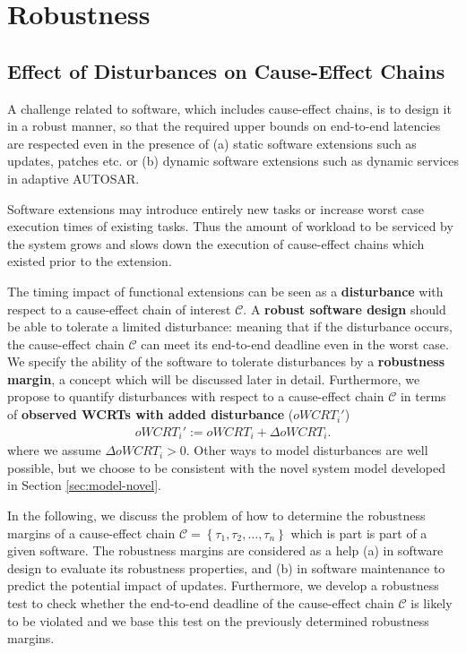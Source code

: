 \section{Robustness}
\label{sec:robustness}

\subsection{Effect of Disturbances on Cause-Effect Chains}
%
A challenge related to software, which includes cause-effect chains, is to design it in a robust manner, so that the required upper bounds on end-to-end latencies are respected even in the presence of (a) static software extensions such as updates, patches etc. or (b) dynamic software extensions such as dynamic services in adaptive AUTOSAR. 
\smallskip

Software extensions may introduce entirely new tasks or increase worst case execution times of existing tasks.
Thus the amount of workload to be serviced by the system grows and slows down the execution of cause-effect chains which existed prior to the extension.
\smallskip

The timing impact of functional extensions can be seen as a \textbf{disturbance} with respect to a cause-effect chain of interest $\mathcal{C}$.
A \textbf{robust software design} should be able to tolerate a limited disturbance: meaning that if the disturbance occurs, the cause-effect chain $\mathcal{C}$ can meet its end-to-end deadline even in the worst case. 
We specify the ability of the software to tolerate disturbances by a \textbf{robustness margin}, a concept which will be discussed later in detail.
Furthermore, we propose to quantify disturbances with respect to a cause-effect chain $\mathcal{C}$ in terms of  \textbf{observed WCRTs with added disturbance} ($oWCRT_i'$) 
\begin{align}
	oWCRT_i' := oWCRT_i + \Delta oWCRT_i. 
\end{align}
where we assume $\Delta oWCRT_i > 0$.
Other ways to model disturbances are well possible, but we choose to be consistent with the novel system model developed in Section \ref{sec:model-novel}. \\
\bigskip

In the following, we discuss the problem of how to determine the robustness margins of a cause-effect chain $\mathcal{C} = \left\{ \tau_1, \tau_2, \ldots, \tau_n \right\}$ which is part is part of a given software.
The robustness margins are considered as a help (a) in software design to evaluate its robustness properties, and (b) in software maintenance to predict the potential impact of updates. 
Furthermore, we develop a robustness test to check whether the end-to-end deadline of the cause-effect chain $\mathcal{C}$ is likely to be violated and we base this test on the previously determined robustness margins.


